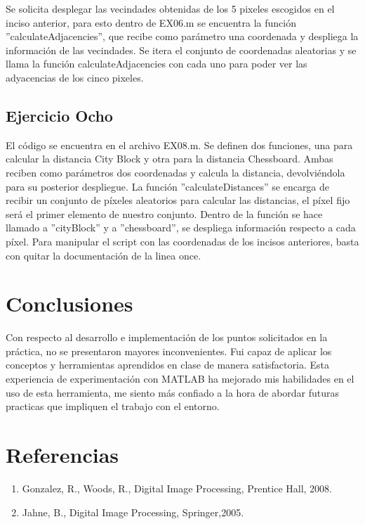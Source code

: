 \documentclass[
  journal=largetwo,
  manuscript=Practica-Dos,
  year=2024-1, %
  volume=37,
  spanish, %
]{cup-journal}
\begin{document}
Se solicita desplegar las vecindades obtenidas de los 5 pixeles escogidos en el inciso anterior, para esto dentro de EX06.m se encuentra la función ''calculateAdjacencies'', que recibe como parámetro una coordenada y despliega la información de las vecindades. Se itera el conjunto de coordenadas aleatorias y se llama la función calculateAdjacencies con cada uno para poder ver las adyacencias de los cinco pixeles. 

\subsection{Ejercicio Ocho}

El código se encuentra en el archivo EX08.m. Se definen dos funciones, una para calcular la distancia City Block y otra para la distancia Chessboard. Ambas reciben como parámetros dos coordenadas y calcula la distancia, devolviéndola para su posterior despliegue. La función ''calculateDistances'' se encarga de recibir un conjunto de píxeles aleatorios para calcular las distancias, el píxel fijo será el primer elemento de nuestro conjunto. Dentro de la función se hace llamado a ''cityBlock'' y a ''chessboard'', se despliega información respecto a cada píxel. Para manipular el script con las coordenadas de los incisos anteriores, basta con quitar la documentación de la linea once.

\section{Conclusiones}

Con respecto al desarrollo e implementación de los puntos solicitados en la práctica, no se presentaron mayores inconvenientes. Fui capaz de aplicar los conceptos y herramientas aprendidos en clase de manera satisfactoria. Esta experiencia de experimentación con MATLAB ha mejorado mis habilidades en el uso de esta herramienta, me siento  más confiado a la hora de abordar futuras practicas que impliquen el trabajo con el entorno.




\section{Referencias}
\begin{enumerate}
    \item Gonzalez, R., Woods, R., Digital Image Processing, Prentice Hall, 2008.
    \item Jahne, B., Digital Image Processing, Springer,2005.
\end{enumerate}
\end{document}
